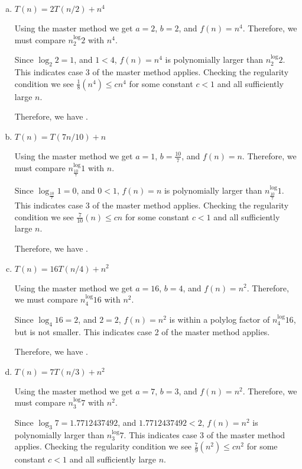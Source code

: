 \documentclass[11pt]{article}
\begin{document}
\begin{enumerate}[(a)]
\item $T(n) = 2T(n/2) + n^4$

Using the master method we get $a = 2$, $b = 2$, and $f(n) = n^4$. Therefore, we must compare $n^\log_2{2}$ with $n^4$.

Since $\log_2{2} = 1$, and $1 < 4$, $f(n) = n^4$ is polynomially larger than $n^\log_2{2}$. This indicates case 3 of the master method applies. Checking the regularity condition we see $\frac{1}{8}(n^4) \leq cn^4$ for some constant $c < 1$ and all sufficiently large $n$.

Therefore, we have .\\


\item $T(n) = T(7n/10) + n$


Using the master method we get $a = 1$, $b = \frac{10}{7}$, and $f(n) = n$. Therefore, we must compare $n^\log_\frac{10}{7} {1}$ with $n$.

Since $\log_\frac{10}{7} {1} = 0$, and $0 < 1$, $f(n) = n$ is polynomially larger than $n^\log_\frac{10}{7} {1}$. This indicates case 3 of the master method applies. Checking the regularity condition we see $\frac{7}{10}(n) \leq cn$ for some constant $c < 1$ and all sufficiently large $n$.

Therefore, we have .\\


\item $T(n) = 16T(n/4) + n^2$


Using the master method we get $a = 16$, $b = 4$, and $f(n) = n^2$. Therefore, we must compare $n^\log_4{16}$ with $n^2$.

Since $\log_4{16} = 2$, and $2 = 2$, $f(n) = n^2$ is within a polylog factor of $n^\log_4{16}$, but is not smaller. This indicates case 2 of the master method applies.

Therefore, we have .\\


\item $T(n) = 7T(n/3) + n^2$


Using the master method we get $a = 7$, $b = 3$, and $f(n) = n^2$. Therefore, we must compare $n^\log_3{7}$ with $n^2$.

Since $\log_3{7} = 1.7712437492$, and $1.7712437492 < 2$, $f(n) = n^2$ is polynomially larger than $n^\log_3{7}$. This indicates case 3 of the master method applies. Checking the regularity condition we see $\frac{7}{9}(n^2) \leq cn^2$ for some constant $c < 1$ and all sufficiently large $n$.


\end{enumerate}
\end{document}
